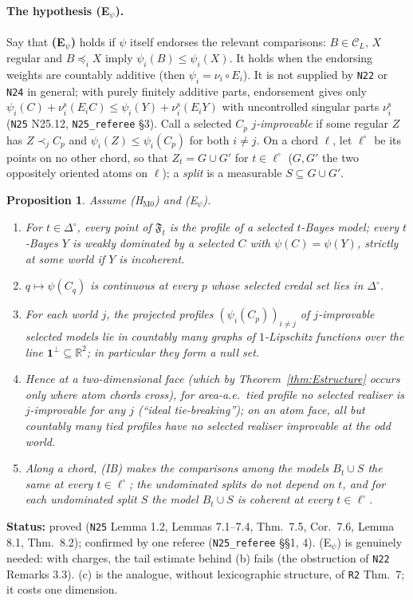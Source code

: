 \documentclass[11pt]{article}
\newtheorem{proposition}[theorem]{Proposition}
\theoremstyle{definition}
\theoremstyle{remark}
\newcommand{\R}{\mathbb R}
\newcommand{\one}{\mathbf 1}
\newcommand{\Di}{\Delta^{\circ}}
\newcommand{\C}{\mathcal C}
\newcommand{\src}[1]{\texttt{#1}}
\newcommand{\status}[1]{\par\smallskip\noindent\textbf{Status:} #1\par\smallskip}
\begin{document}
\paragraph{The hypothesis (E$_\psi$).} Say that \textbf{(E$_\psi$)} holds if $\psi$ itself endorses the relevant comparisons: $B\in\C_L$, $X$ regular and $B\preceq_iX$ imply $\psi_i(B)\le\psi_i(X)$. It holds when the endorsing weights are countably additive (then $\psi_i=\nu_i\circ E_i$). It is not supplied by \src{N22} or \src{N24} in general; with purely finitely additive parts, endorsement gives only $\psi_i(C)+\nu^{\mathrm s}_i(E_iC)\le\psi_i(Y)+\nu^{\mathrm s}_i(E_iY)$ with uncontrolled singular parts $\nu^{\mathrm s}_i$ (\src{N25} N25.12, \src{N25\_referee} \S3). Call a selected $C_p$ \emph{$j$-improvable} if some regular $Z$ has $Z\prec_jC_p$ and $\psi_i(Z)\le\psi_i(C_p)$ for both $i\ne j$. On a chord $\ell$, let $\ell^\circ$ be its points on no other chord, so that $Z_t=G\cup G'$ for $t\in\ell^\circ$ ($G,G'$ the two oppositely oriented atoms on $\ell$); a \emph{split} is a measurable $S\subseteq G\cup G'$.

\begin{proposition}\label{prop:Epsi}
Assume (H$_{\mathrm{M0}}$) and (E$_\psi$).
\begin{enumerate}[leftmargin=*,label=(\alph*)]
\item For $t\in\Di$, every point of $\mathfrak F_t$ is the profile of a selected $t$-Bayes model; every $t$-Bayes $Y$ is weakly dominated by a selected $C$ with $\psi(C)=\psi(Y)$, strictly at some world if $Y$ is incoherent.
\item $q\mapsto\psi(C_q)$ is continuous at every $p$ whose selected credal set lies in $\Di$.
\item For each world $j$, the projected profiles $(\psi_i(C_p))_{i\ne j}$ of $j$-improvable selected models lie in countably many graphs of $1$-Lipschitz functions over the line $\one^\perp\subseteq\R^2$; in particular they form a null set.
\item Hence at a two-dimensional face (which by Theorem~\ref{thm:Estructure} occurs only where atom chords cross), for area-a.e.\ tied profile no selected realiser is $j$-improvable for any $j$ (``ideal tie-breaking''); on an atom face, all but countably many tied profiles have no selected realiser improvable at the odd world.
\item Along a chord, (IB) makes the comparisons among the models $B_t\cup S$ the same at every $t\in\ell^\circ$; the undominated splits do not depend on $t$, and for each undominated split $S$ the model $B_t\cup S$ is coherent at every $t\in\ell^\circ$.
\end{enumerate}
\end{proposition}
\status{proved (\src{N25} Lemma 1.2, Lemmas 7.1--7.4, Thm.~7.5, Cor.~7.6, Lemma 8.1, Thm.~8.2); confirmed by one referee (\src{N25\_referee} \S\S1, 4). (E$_\psi$) is genuinely needed: with charges, the tail estimate behind (b) fails (the obstruction of \src{N22} Remarks 3.3). (c) is the analogue, without lexicographic structure, of \src{R2} Thm.~7; it costs one dimension.}
\end{document}
